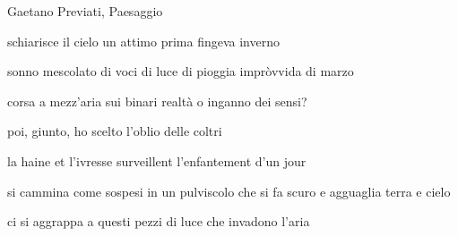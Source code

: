 \begin{volumetitlepage}
\end{volumetitlepage}


\begin{artItem}
	Gaetano Previati, Paesaggio
\end{artItem}

\begin{poem}
	\begin{stanza}
		schiarisce il cielo\verseline
		un attimo prima fingeva inverno
	\end{stanza}
\end{poem}

\clearpage


\begin{poem}
	\begin{stanza}
		sonno mescolato di voci\verseline
		di luce\verseline
		di pioggia impròvvida di marzo
	\end{stanza}

	\begin{stanza}
		corsa a mezz’aria sui binari\verseline
		realtà o inganno dei sensi?
	\end{stanza}

	\begin{stanza}
		poi, giunto, ho scelto\verseline
		l’oblio delle coltri
	\end{stanza}
\end{poem}

\clearpage


\begin{poem}
	\begin{otherlanguage}{french}
		\begin{stanza}
			la haine et l’ivresse surveillent\verseline
			l’enfantement d’un jour
		\end{stanza}
	\end{otherlanguage}
\end{poem}

\clearpage


\begin{poem}
	\begin{stanza}
		si cammina come sospesi\verseline
		in un pulviscolo che si fa scuro\verseline
		e agguaglia terra e cielo
	\end{stanza}

	\begin{stanza}
		ci si aggrappa a questi pezzi\verseline
		di luce che invadono l’aria
	\end{stanza}
\end{poem}

